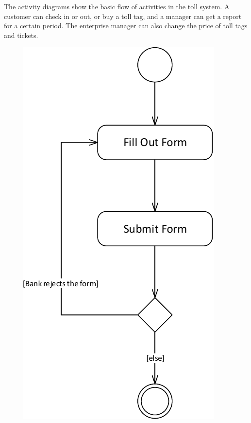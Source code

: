 The activity diagrams show the basic flow of activities in the toll system. A customer can check in or out, or buy a toll tag, and a manager can get a report for a certain period. The enterprise manager can also change the price of toll tags and tickets.

\begin{figure}[H]
	\centering
	\begin{minipage}{0.3\textwidth}
	\includegraphics[width=\textwidth]{img/activity_diagram/buy_toll_tag}

\end{minipage}
\end{figure}
